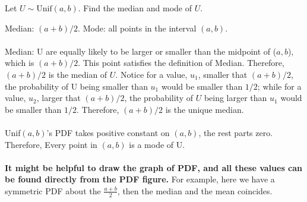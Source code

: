 
\setcounter{theorem}{0}
\begin{exercise} [BH.6.1] Let $U \sim \text{Unif}(a, b)$. Find the median and mode of $U$.

\begin{solution}
    Median: $(a+b)/2$. Mode: all points in the interval $(a,b)$.\\~\\
	Median: U are equally likely to be larger or smaller than the midpoint of ($a, b$), which is $( a + b ) / 2$. This point satisfies the definition of Median. Therefore, $( a + b ) / 2$ is the median of $U$. Notice for a value, $u_1$, smaller that $( a + b ) / 2$, the probability of U being smaller than $u_1$ would be smaller than $1/2$; while for a value, $u_2$, larger that $( a + b ) / 2$, the probability of $U$ being larger than $u_1$ would be smaller than $1/2$. Therefore, $(a+b)/2$ is the unique median. \\~\\
	Unif$(a,b)$'s PDF takes positive constant on $(a,b)$, the rest parts zero. Therefore, Every
	point in $( a, b )$ is a mode of U.\\~\\
	\textbf{It might be helpful to draw the graph of PDF, and all these values can be found directly from the PDF figure.} For example, here we have a symmetric PDF about the $\frac{a+b}{2}$, then the median and the mean coincides.
\end{solution}
\end{exercise}

